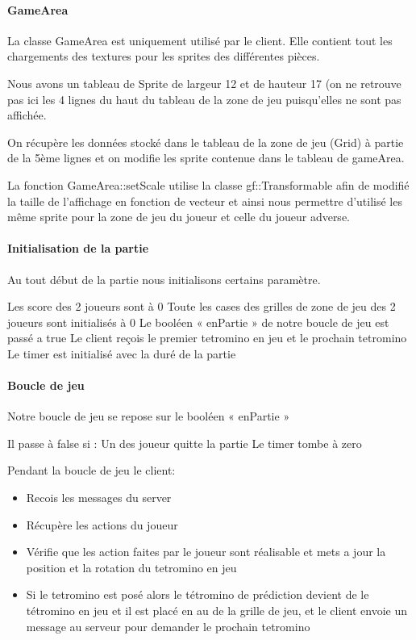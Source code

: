 \documentclass[a4paper, 12pt]{article}
\begin{document}
			\paragraph{GameArea}

			La classe GameArea est uniquement utilisé par le client. Elle contient tout les chargements des textures pour les sprites des différentes pièces.

			Nous avons un tableau de Sprite de largeur 12 et de hauteur 17 (on ne retrouve pas ici les 4 lignes du haut du tableau de la zone de jeu puisqu’elles ne sont pas affichée.

			On récupère les données stocké dans le tableau de la zone de jeu (Grid) à partie de la 5ème lignes et on modifie les sprite contenue dans le tableau de gameArea.

			La fonction GameArea::setScale utilise la classe gf::Transformable afin de modifié la taille de l’affichage en fonction de vecteur et ainsi nous permettre d’utilisé les même sprite pour la zone de jeu du joueur et celle du joueur adverse.

			\paragraph{Initialisation de la partie}

				Au tout début de la partie nous initialisons certains paramètre.

				Les score des 2 joueurs sont à 0
				Toute les cases des grilles de zone de jeu des 2 joueurs sont initialisés à 0
				Le booléen « enPartie » de notre boucle de jeu est passé a true
				Le client reçois le premier tetromino en jeu et le prochain tetromino
				Le timer est initialisé avec la duré de la partie


			\paragraph{Boucle de jeu}

			Notre boucle de jeu se repose sur le booléen « enPartie »

			Il passe à false si : 
			    Un des joueur quitte la partie
			    Le timer tombe à zero

			Pendant la boucle de jeu le client:

	\begin{itemize}
		\item Recois les messages du server
		\item Récupère les actions du joueur
		\item Vérifie que les action faites par le joueur sont réalisable et mets a jour la position et la rotation du tetromino en jeu
		\item Si le tetromino est posé alors le tétromino de prédiction devient de le tétromino en jeu et il est placé en au de la grille de jeu, et le client envoie un message au serveur pour demander le prochain tetromino
	\end{itemize}
\end{document}
